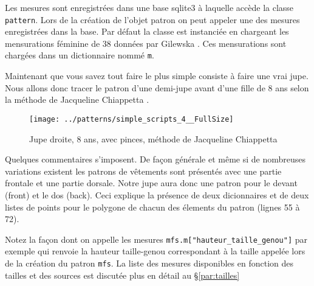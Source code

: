 \documentclass[10pt,a4paper,twoside]{report}
\begin{document}
Les mesures sont enregistrées dans une base sqlite3 à laquelle accède la classe \texttt{pattern}. Lors de la création de l'objet patron on peut appeler une des mesures enregistrées dans la base. Par défaut la classe est instanciée en chargeant les mensurations féminine de 38 données par Gilewska \cite{Gilewska1}. Ces mensurations sont chargées dans un dictionnaire nommé \texttt{m}.

Maintenant que vous savez tout faire le plus simple consiste à faire une vrai jupe. Nous allons donc tracer le patron d'une demi-jupe avant d'une fille de 8 ans selon la méthode de Jacqueline Chiappetta \cite{Chiappetta1999}.




\begin{figure}[tb]
\begin{center}
\texttt{[image: ../patterns/simple\_scripts\_4\_\_FullSize]}
\end{center}
\caption{Jupe droite, 8 ans, avec pinces, méthode de Jacqueline Chiappetta}
\label{fig:trapeze}
\end{figure}

Quelques commentaires s'imposent. De façon générale et même si de nombreuses variations existent les patrons de vêtements sont présentés avec une partie frontale et une partie dorsale. Notre jupe aura donc une patron pour le devant (front) et le dos (back). Ceci explique la présence de deux dicionnaires et de deux listes de points pour le polygone de chacun des élements du patron (lignes 55 à 72).

Notez la façon dont on appelle les mesures \texttt{mfs.m["hauteur\_taille\_genou"]} par exemple qui renvoie la hauteur taille-genou correspondant à la taille appelée lors de la création du patron \texttt{mfs}. La liste des mesures disponibles en fonction des tailles et des sources est discutée plus en détail au \S\ref{par:tailles}
\end{document}
